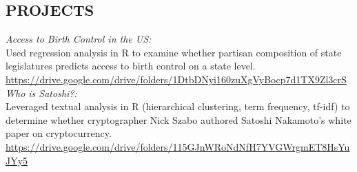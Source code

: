 \documentclass[margin]{res}
\begin{document}
\begin{resume}
\section{PROJECTS}
	\textit{Access to Birth Control in the US:} \\
	Used regression analysis in R to examine whether partisan composition of state legislatures predicts access to birth control on a state level. \\
    \hspace*{2ex} \href{https://drive.google.com/drive/folders/1DtbDNyi160zuXgVyBocp7d1TX9Zl3crS}{https://drive.google.com/drive/folders/1DtbDNyi160zuXgVyBocp7d1TX9Zl3crS} \\
    \newline
    \textit{Who is Satoshi?:} \\
    Leveraged textual analysis in R (hierarchical clustering, term frequency, tf-idf) to determine whether cryptographer Nick Szabo authored Satoshi Nakamoto's white paper on cryptocurrency. \\
    \hspace*{2ex} \href{https://drive.google.com/drive/folders/115GJnWRoNdNfH7YVGWrgmET8HsYuJYy5}{https://drive.google.com/drive/folders/115GJnWRoNdNfH7YVGWrgmET8HsYuJYy5}
	

\end{resume}
\end{document}
